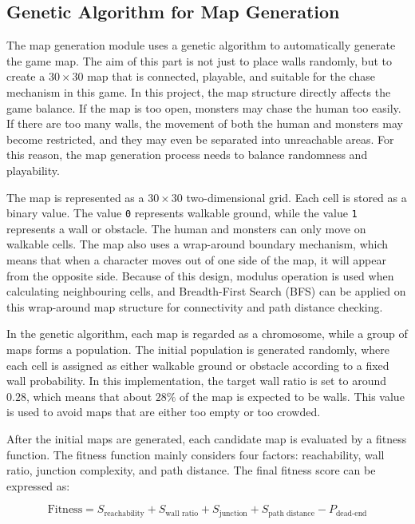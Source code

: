 \subsection{Genetic Algorithm for Map Generation}

The map generation module uses a genetic algorithm to automatically generate the game map. The aim of this part is not just to place walls randomly, but to create a $30 \times 30$ map that is connected, playable, and suitable for the chase mechanism in this game. In this project, the map structure directly affects the game balance. If the map is too open, monsters may chase the human too easily. If there are too many walls, the movement of both the human and monsters may become restricted, and they may even be separated into unreachable areas. For this reason, the map generation process needs to balance randomness and playability.

The map is represented as a $30 \times 30$ two-dimensional grid. Each cell is stored as a binary value. The value \texttt{0} represents walkable ground, while the value \texttt{1} represents a wall or obstacle. The human and monsters can only move on walkable cells. The map also uses a wrap-around boundary mechanism, which means that when a character moves out of one side of the map, it will appear from the opposite side. Because of this design, modulus operation is used when calculating neighbouring cells, and Breadth-First Search (BFS) can be applied on this wrap-around map structure for connectivity and path distance checking.

In the genetic algorithm, each map is regarded as a chromosome, while a group of maps forms a population. The initial population is generated randomly, where each cell is assigned as either walkable ground or obstacle according to a fixed wall probability. In this implementation, the target wall ratio is set to around $0.28$, which means that about $28\%$ of the map is expected to be walls. This value is used to avoid maps that are either too empty or too crowded.

After the initial maps are generated, each candidate map is evaluated by a fitness function. The fitness function mainly considers four factors: reachability, wall ratio, junction complexity, and path distance. The final fitness score can be expressed as:

\begin{equation}
\text{Fitness} =
S_{\text{reachability}}
+ S_{\text{wall ratio}}
+ S_{\text{junction}}
+ S_{\text{path distance}}
- P_{\text{dead-end}}
\end{equation}

